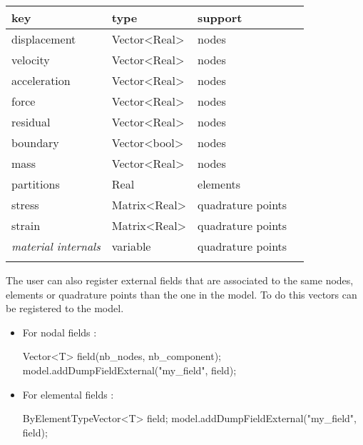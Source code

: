 \begin{tabular}{llll}
  \toprule
  key          &    type      & support \\
  \midrule
  displacement & Vector<Real> & nodes  \\
  velocity     & Vector<Real> & nodes  \\
  acceleration & Vector<Real> & nodes  \\
  force	     & Vector<Real> & nodes  \\
  residual     & Vector<Real> & nodes  \\
  boundary     & Vector<bool> & nodes  \\
  mass         & Vector<Real> & nodes  \\
  partitions   & Real         & elements \\
  stress & Matrix<Real> & quadrature points  \\
  strain & Matrix<Real> & quadrature points  \\
  \textit{material internals} & variable  & quadrature points  \\
  \bottomrule\\
\end{tabular}


The user can also register external fields that are associated to the same
nodes, elements or quadrature points than the one in the model. To do this
vectors can be registered to the model.

\begin{itemize}
\item For nodal fields :
\begin{cpp}
  Vector<T> field(nb_nodes, nb_component);
  model.addDumpFieldExternal("my_field", field);
\end{cpp}

\item For elemental fields :
\begin{cpp}
  ByElementTypeVector<T> field;
  model.addDumpFieldExternal("my_field", field);
\end{cpp}
\end{itemize}


